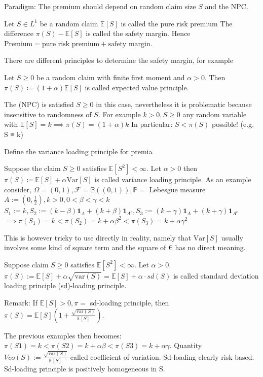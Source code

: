 \documentclass[11pt,a4paper,twoside]{article}
\begin{document}
Paradigm: 
The premium should depend on random claim size \( S \)
and the NPC.

Let \( S \in L^1 \) be a random claim
\( \mathbb{E}[S] \) is called the pure risk premium
The difference
\( \pi(S) - \mathbb{E}[S] \) is called the safety margin.
Hence
\( \text{Premium} = \text{pure risk premium} + \text{safety margin} \).

There are different principles to determine the safety margin, for example

Let \( S \geq 0 \) be a random claim with finite first moment and \( \alpha > 0 \). 
Then \( \pi(S) \coloneqq (1 + \alpha)\mathbb{E}[S] \)
is called expected value principle.

The (NPC) is satisfied \(S ≥ 0\) in this case,
nevertheless it is problematic because insensitive to randomness of \( S \).
For example \( k > 0, S \geq 0 \) any random variable with \( \mathbb{E}[S] = k \implies \pi(S) = (1 + \alpha)k \)
In particular: \( S < \pi(S) \) possible! (e.g. S ≡ k)

Define the variance loading principle for premia

Suppose the claim \( S \geq 0 \) satisfies \( \mathbb{E}[S^2] < \infty\). Let \( \alpha > 0 \)
then \( \pi(S) \coloneqq \mathbb{E}[S] + \alpha \text{Var}[S] \)
is called variance loading principle.
As an example consider,
\(\Omega = (0, 1), \mathcal{F} = \mathbb{B}((0, 1)), \mathbb{P} =\) Lebesgue measure
\(A := (0, \frac{1}{2}), k > 0, 0 < \beta < \gamma < k\)
\(S_1 := k, S_2 := (k - \beta)\mathbf{1}_A + (k + \beta)\mathbf{1}_{A^c}, S_3 := (k - \gamma)\mathbf{1}_A + (k + \gamma)\mathbf{1}_{A^c}\)
\(\implies \pi(S_1) = k < \pi(S_2) = k + \alpha \beta^2 < \pi(S_3) = k + \alpha \gamma^2\)

This is however tricky to use directly in reality, namely that \( \text{Var}[S] \) usually involves some kind
of square term and the square of € has no direct meaning.


Suppose claim \(S \ge 0\) satisfies \(\mathbb{E}[S^2] < \infty\). Let \(\alpha > 0\).
\(\pi(S) := \mathbb{E}[S] + \alpha \sqrt{\text{var}(S)} = \mathbb{E}[S] + \alpha \cdot sd(S)\)
is called standard deviation loading principle (sd)-loading principle.

Remark:
If \(\mathbb{E}[S] > 0, \pi =\) sd-loading principle, then
\(\pi(S) = \mathbb{E}[S] \left( 1 + \frac{\sqrt{\text{var}(S)}}{\mathbb{E}[S]} \right).\)

The previous examples then becomes:
\( π(S1) = k < π(S2) = k + αβ < π(S3) = k + αγ \).
Quantity \(Vco(S) := \frac{\sqrt{\text{var}(S)}}{\mathbb{E}[S]}\) called coefficient of variation. Sd-loading clearly risk based.
Sd-loading principle is positively homogeneous in S.
\end{document}
